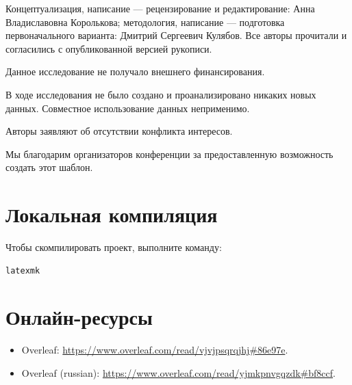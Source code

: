\documentclass[%
]{ittmm}
\begin{document}

\vspace{\baselineskip}

\begin{authorcontributions}
  Концептуализация, написание --- рецензирование и редактирование: Анна Владиславовна Королькова; методология, написание --- подготовка первоначального варианта: Дмитрий Сергеевич Кулябов.
  Все авторы прочитали и согласились с опубликованной версией рукописи.
\end{authorcontributions}

\begin{funding}
  Данное исследование не получало внешнего финансирования.
\end{funding}

\begin{dataavailability}
  В ходе исследования не было создано и проанализировано никаких новых данных. Совместное использование данных неприменимо.
\end{dataavailability}

\begin{conflictsofinterest}
  Авторы заявляют об отсутствии конфликта интересов.
\end{conflictsofinterest}

\begin{acknowledgments}
  Мы благодарим организаторов конференции за предоставленную возможность создать этот шаблон.
\end{acknowledgments}

\printbibliography

\appendix

\section{Локальная компиляция}

Чтобы скомпилировать проект, выполните команду:
\begin{verbatim}
latexmk
\end{verbatim}

\section{Онлайн-ресурсы}

\begin{itemize}
\item Overleaf: \url{https://www.overleaf.com/read/vjvjpsqrqjhj#86e97e}.
\item Overleaf (russian): \url{https://www.overleaf.com/read/yjmkpnvgqzdk#bf8ccf}.
\end{itemize}
\end{document}
